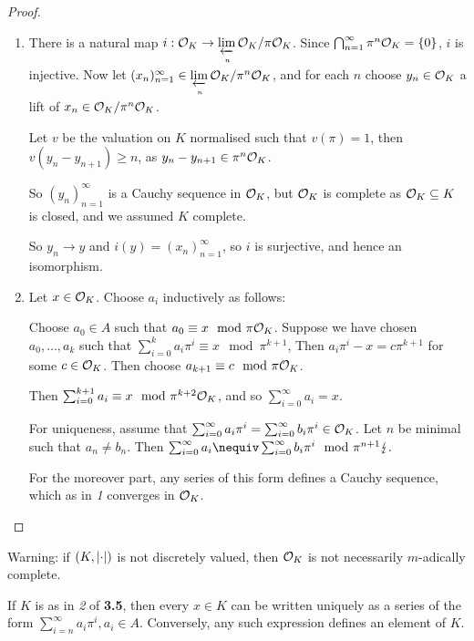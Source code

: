 \documentclass[10pt,a4paper]{article}
\begin{document}
\begin{proof}\hspace*{0cm}
  \begin{enumerate}[label=\textit{\arabic*.}]
    \item There is a natural map $i:\mathcal{O}_K \to \lim\limits_{\xleftarrow[n]{}} \mathcal{O}_K/\pi\mathcal{O}_K$. Since $\bigcap_{n=1}^\infty \pi^n \mathcal{O}_K = \{0\}$, $i$ is injective. Now let $(x_n)_{n=1}^\infty \in \lim\limits_{\xleftarrow[n]{}}\mathcal{O}_K/\pi^n\mathcal{O}_K$,
    and for each $n$ choose $y_n \in \mathcal{O}_K$ a lift of $x_n \in \mathcal{O}_K/\pi^n\mathcal{O}_K$.

    Let $v$ be the valuation on $K$ normalised such that $v(\pi) = 1$, then $v(y_n - y_{n+1}) \geq n$, as $y_n - y_{n+1} \in \pi^n \mathcal{O}_K$.

    So $(y_n)_{n=1}^\infty$ is a Cauchy sequence in $\mathcal{O}_K$, but $\mathcal{O}_K$ is complete as $\mathcal{O}_K \subseteq K$ is closed, and we assumed $K$ complete.

    So $y_n \to y$ and $i(y) = (x_n)_{n=1}^\infty$, so $i$ is surjective, and hence an isomorphism.

    \item Let $x \in \mathcal{O}_K$. Choose $a_i$ inductively as follows:

    Choose $a_0 \in A$ such that $a_0 \equiv x \mod \pi\mathcal{O}_K$. Suppose we have chosen $a_0, \ldots, a_k$ such that $\sum_{i=0}^k a_i \pi^i \equiv x \mod \pi^{k+1}$, Then $a_i \pi^i - x  = c\pi^{k+1}$ for some $c \in \mathcal{O}_K$. Then choose $a_{k+1} \equiv c \mod \pi\mathcal{O}_K$.

    Then $\sum_{i=0}^{k+1} a_i \equiv x \mod \pi^{k+2}\mathcal{O}_K$, and so $\sum_{i=0}^\infty a_i =x$.

    For uniqueness, assume that $\sum_{i=0}^\infty a_i \pi^i = \sum_{i=0}^\infty b_i \pi^i \in \mathcal{O}_K$. Let $n$ be minimal such that $a_n \neq b_n$. Then $\sum_{i=0}^\infty a_i \nequiv \sum_{i=0}^\infty b_i \pi^i \mod \pi^{n+1} \contr.$

    For the moreover part, any series of this form defines a Cauchy sequence, which as in \textit{1} converges in $\mathcal{O}_K$.
  \end{enumerate}
\end{proof}

Warning: if $(K, \lvert\cdot\rvert)$ is not discretely valued, then $\mathcal{O}_K$ is not necessarily $m$-adically complete.

\begin{corollary}
  If $K$ is as in \textit{2} of \textbf{3.5}, then every $x \in K$ can be written uniquely as a series of the form $\sum_{i=n}^\infty a_i \pi^i, a_i \in A$. Conversely, any such expression defines an element of $K$.
\end{corollary}
\end{document}
